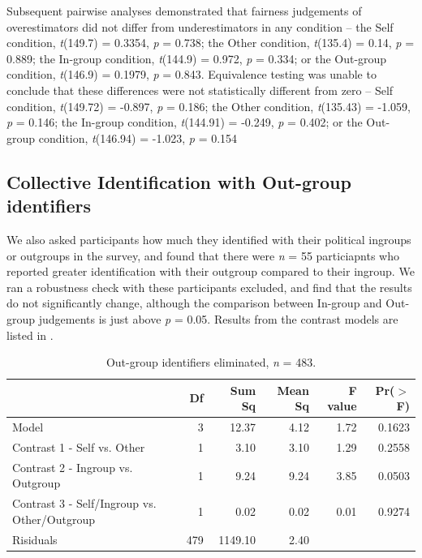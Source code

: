 \documentclass[12pt,]{article}
\begin{document}
Subsequent pairwise analyses demonstrated that fairness judgements of overestimators did not differ from underestimators in any condition -- the Self condition, \emph{t}(149.7) = 0.3354, \emph{p} = 0.738; the Other condition, \emph{t}(135.4) = 0.14, \emph{p} = 0.889; the In-group condition, \emph{t}(144.9) = 0.972, \emph{p} = 0.334; or the Out-group condition, \emph{t}(146.9) = 0.1979, \emph{p} = 0.843. Equivalence testing was unable to conclude that these differences were not statistically different from zero -- Self condition,  \emph{t}(149.72) = -0.897, \emph{p} = 0.186; the Other condition, \emph{t}(135.43) = -1.059, \emph{p} = 0.146; the In-group condition, \emph{t}(144.91) = -0.249, \emph{p} = 0.402; or the Out-group condition, \emph{t}(146.94) = -1.023, \emph{p} = 0.154



\clearpage
\subsection{Collective Identification with Out-group identifiers}
\label{appendix:CID1}


We also asked participants how much they identified with their political ingroups or outgroups in the survey, and found that there were \emph{n} = 55 particiapnts who reported greater identification with their outgroup compared to their ingroup. We ran a robustness check with these participants excluded, and find that the results do not significantly change, although the comparison between In-group and Out-group judgements is just above \emph{p} = 0.05. Results from the contrast models are listed in . 

\begin{table}[ht]
\centering
\begin{tabular}{lrrrrr}
  \hline
 & Df & Sum Sq & Mean Sq & F value & Pr($>$F) \\ 
  \hline
Model & 3 & 12.37 & 4.12 & 1.72 & 0.1623 \\ 
  Contrast 1 - Self vs. Other & 1 & 3.10 & 3.10 & 1.29 & 0.2558 \\ 
  Contrast 2 - Ingroup vs. Outgroup & 1 & 9.24 & 9.24 & 3.85 & 0.0503 \\ 
  Contrast 3 - Self/Ingroup vs. Other/Outgroup & 1 & 0.02 & 0.02 & 0.01 & 0.9274 \\ 
  Risiduals & 479 & 1149.10 & 2.40 &  &  \\ 
   \hline
\end{tabular}
\caption{Out-group identifiers eliminated, \emph{n} = 483. } 
\label{mismatch1}
\end{table}
\end{document}
